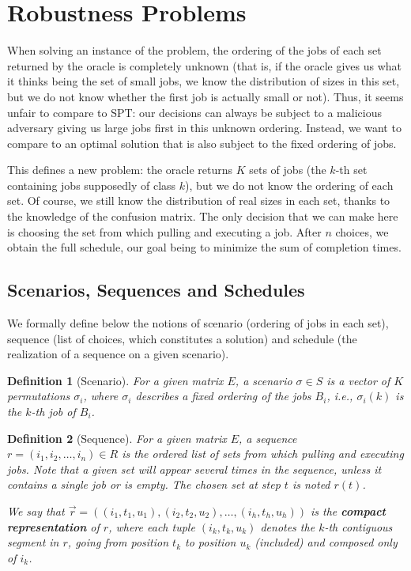 \documentclass{article}
\newtheorem{definition}{Definition}
\begin{document}
\section{Robustness Problems}

When solving an instance of the problem, the ordering of the jobs of each set returned by the oracle is completely unknown (that is, if the oracle gives us what it thinks being the set of small jobs, we know the distribution of sizes in this set, but we do not know whether the first job is actually small or not).
Thus, it seems unfair to compare to SPT: our decisions can always be subject to a malicious adversary giving us large jobs first in this unknown ordering.
Instead, we want to compare to an optimal solution that is also subject to the fixed ordering of jobs.

This defines a new problem: the oracle returns \(K\) sets of jobs (the \(k\)-th set containing jobs supposedly of class \(k\)), but we do not know the ordering of each set.
Of course, we still know the distribution of real sizes in each set, thanks to the knowledge of the confusion matrix.
The only decision that we can make here is choosing the set from which pulling and executing a job.
After \(n\) choices, we obtain the full schedule, our goal being to minimize the sum of completion times.

\subsection{Scenarios, Sequences and Schedules}

We formally define below the notions of scenario (ordering of jobs in each set), sequence (list of choices, which constitutes a solution) and schedule (the realization of a sequence on a given scenario).

\begin{definition}[Scenario]
    For a given matrix \(E\), a scenario \(\sigma\in S\) is a vector of \(K\) permutations \(\sigma_i\), where \(\sigma_i\) describes a fixed ordering of the jobs \(B_i\), i.e., \(\sigma_i(k)\) is the \(k\)-th job of \(B_i\).
\end{definition}

\begin{definition}[Sequence]
    For a given matrix \(E\), a sequence \(r=(i_1,i_2,\ldots,i_n)\in R\) is the ordered list of sets from which pulling and executing jobs.
    Note that a given set will appear several times in the sequence, unless it contains a single job or is empty.
    The chosen set at step \(t\) is noted \(r(t)\).

    We say that \(\overrightarrow{r}=((i_1,t_1,u_1),(i_2,t_2,u_2),\ldots,(i_h,t_h,u_h))\) is the \textbf{compact representation} of \(r\), where each tuple \((i_k,t_k,u_k)\) denotes the \(k\)-th contiguous segment in \(r\), going from position \(t_k\) to position \(u_k\) (included) and composed only of \(i_k\).
\end{definition}
\end{document}
